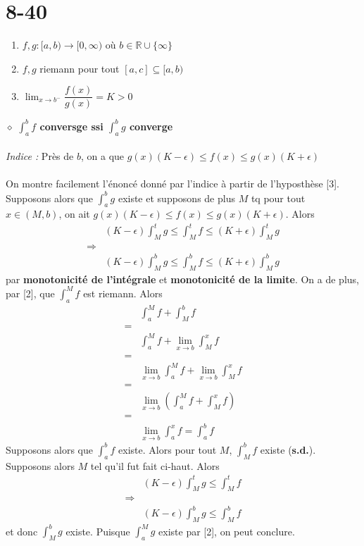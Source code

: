 \documentclass[a4paper,10pt]{article}
\begin{document}
\section*{8-40}
\begin{enumerate}
 \item $f,g : [a,b) \rightarrow [0, \infty)$ où $b \in \mathbb{R} \cup \{\infty\}$
 \item $f,g$ riemann pour tout $[a,c] \subseteq [a,b)$
 \item $\lim_{x \to b^-} \dfrac{f(x)}{g(x)} = K > 0$
\end{enumerate}
$\diamond$ \textbf{$\int_a^b f$ conversge ssi $\int_a^b g$ converge}
\\
\\
\textit{Indice : } Près de $b$, on a que $g(x)(K - \epsilon) \leq f(x) \leq g(x)(K + \epsilon)$
\\
\\
On montre facilement l'énoncé donné par l'indice à partir de l'hyposthèse [3]. Supposons alors que 
$\int_a^b g$ existe et supposons de plus $M$ tq pour tout $x \in (M,b)$, on ait 
$g(x)(K - \epsilon) \leq f(x) \leq g(x)(K + \epsilon)$. Alors 
\begin{align*}
 & (K-\epsilon) \int_M^t g \leq \int_M^t f \leq (K + \epsilon) \int_M^t g \\
 \Rightarrow \\
 & (K - \epsilon) \int_M^b g \leq \int_M^b f \leq (K + \epsilon) \int_M^b g
\end{align*}
par \textbf{monotonicité de l'intégrale} et \textbf{monotonicité de la limite}. On a de plus, par [2], que $\int_a^M f$ est riemann.
Alors 
\begin{align*}
 & \int_a^M f + \int_M^b f \\
 = \\
 & \int_a^M f + \lim_{x \to b} \int_M^x f \\
 = \\
 & \lim_{x \to b} \int_a^M f + \lim_{x \to b} \int_M^x f \\
 = \\
 & \lim_{x \to b} \left ( \int_a^M f + \int_M^x f \right ) \\
 = \\
 & \lim_{x \to b} \int_a^x f = \int_a^b f
\end{align*}
Supposons alors que $\int_a^b f$ existe. Alors pour tout $M$, $\int_M^b f$ existe (\textbf{s.d.}). Supposons alors $M$ tel qu'il fut fait
ci-haut. Alors 
\begin{align*}
 & (K - \epsilon) \int_M^t g \leq \int_M^t f \\
 \Rightarrow \\
 & (K - \epsilon) \int_M^b g \leq \int_M^b f
\end{align*}
et donc $\int_M^b g$ existe. Puisque $\int_a^M g$ existe par [2], on peut conclure.
\end{document}
